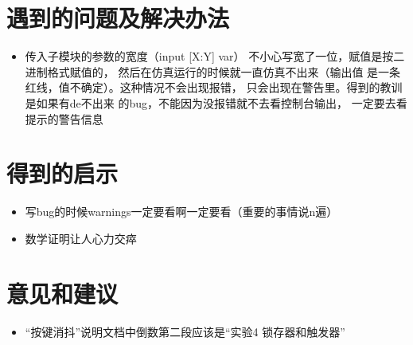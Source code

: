 \documentclass[12pt,a4paper,UTF8]{article}
\begin{document}
\section{遇到的问题及解决办法}
\begin{itemize}
  \item 传入子模块的参数的宽度（input [X:Y] var）
        不小心写宽了一位，赋值是按二进制格式赋值的，
        然后在仿真运行的时候就一直仿真不出来（输出值
        是一条红线，值不确定）。这种情况不会出现报错，
        只会出现在警告里。得到的教训是如果有de不出来
        的bug，不能因为没报错就不去看控制台输出，
        一定要去看提示的警告信息
\end{itemize}

\section{得到的启示}
\begin{itemize}
  \item 写bug的时候warnings一定要看啊一定要看（重要的事情说n遍）
  \item 数学证明让人心力交瘁
\end{itemize}

\section{意见和建议}
\begin{itemize}
  \item ``按键消抖''说明文档中倒数第二段应该是``实验4 锁存器和触发器''
\end{itemize}
\end{document}
